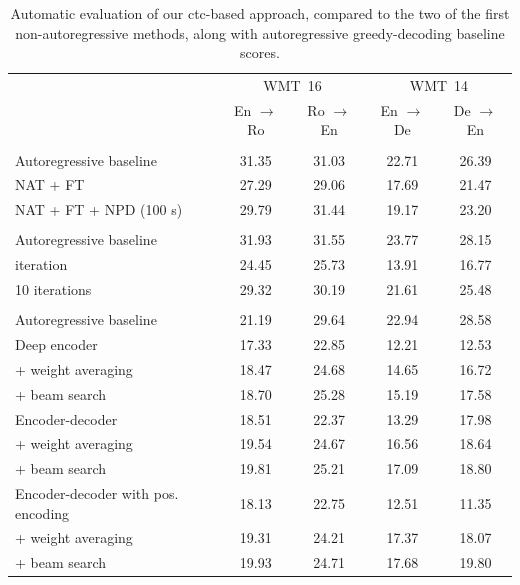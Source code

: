 \begin{table}
  \centering
  \begin{tabular}{lcccc}
    \toprule
     & \multicolumn{2}{c}{WMT~16} & \multicolumn{2}{c}{WMT~14} \\
     & En $\rightarrow$ Ro & Ro $\rightarrow$ En & En $\rightarrow$ De & De $\rightarrow$ En \\
    \midrule
    \citet{gu2017nonautoregressive} & & & & \\
    Autoregressive baseline & 31.35 & 31.03 & 22.71 & 26.39 \\
    \addlinespace
    NAT + FT & 27.29 & 29.06 & 17.69 & 21.47 \\
    NAT + FT + NPD (100 s) & 29.79 & 31.44 & 19.17 & 23.20 \\
    \midrule
    \citet{lee-etal-2018-deterministic} & & & & \\
    Autoregressive baseline & 31.93 & 31.55  & 23.77 & 28.15 \\
    \addlinespace
    1 iteration & 24.45 & 25.73 & 13.91 & 16.77 \\
    10 iterations & 29.32 & 30.19 & 21.61 & 25.48 \\
    \midrule
    \citet{libovicky-helcl-2018-end} & & & & \\
    Autoregressive baseline & 21.19 & 29.64 & 22.94 & 28.58 \\
    \addlinespace
    Deep encoder & 17.33 & 22.85 & 12.21 & 12.53 \\
    \quad + weight averaging & 18.47 & 24.68 & 14.65 & 16.72 \\
    \quad + beam search & 18.70 & 25.28 & 15.19 & 17.58 \\
    \addlinespace
    Encoder-decoder  & 18.51 & 22.37 & 13.29 & 17.98 \\
    \quad + weight averaging & 19.54 & 24.67 & 16.56 & 18.64 \\
    \quad + beam search & 19.81 & 25.21 & 17.09 & 18.80  \\
    \addlinespace
    Encoder-decoder with pos. encoding & 18.13 & 22.75 & 12.51 & 11.35 \\
    \quad + weight averaging & 19.31 & 24.21 & 17.37 & 18.07 \\
    \quad + beam search & 19.93 & 24.71 & 17.68 & 19.80 \\
    \bottomrule
  \end{tabular}

  \caption{Automatic evaluation of our \acs{ctc}-based approach, compared to
    the two of the first non-autoregressive methods, along with autoregressive
    greedy-decoding baseline scores. }%
  \label{tab:end-to-end:bleu}
\end{table}

